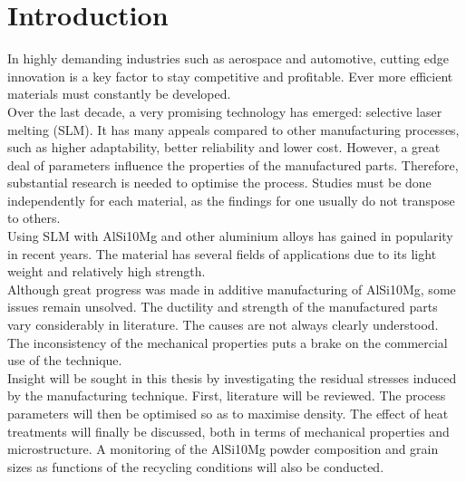 \chapter{Introduction}
\label{Chap1}

In highly demanding industries such as aerospace and automotive, cutting edge innovation is a key factor to stay competitive and profitable. Ever more efficient materials must constantly be developed.\\

Over the last decade, a very promising technology has emerged: selective laser melting (SLM). It has many appeals compared to other manufacturing processes, such as higher adaptability, better reliability and lower cost. However, a great deal of parameters influence the properties of the manufactured parts. Therefore, substantial research is needed to optimise the process. Studies must be done independently for each material, as the findings for one usually do not transpose to others.\\

Using SLM with AlSi10Mg and other aluminium alloys has gained in popularity in recent years. The material has several fields of applications due to its light weight and relatively high strength.\\

Although great progress was made in additive manufacturing of AlSi10Mg, some issues remain unsolved. The ductility and strength of the manufactured parts vary considerably in literature. The causes are not always clearly understood. The inconsistency of the mechanical properties puts a brake on the commercial use of the technique.\\

Insight will be sought in this thesis by investigating the residual stresses induced by the manufacturing technique. First, literature will be reviewed. The process parameters will then be optimised so as to maximise density. The effect of heat treatments will finally be discussed, both in terms of mechanical properties and microstructure. A monitoring of the AlSi10Mg powder composition and grain sizes as functions of the recycling conditions will also be conducted.\\
